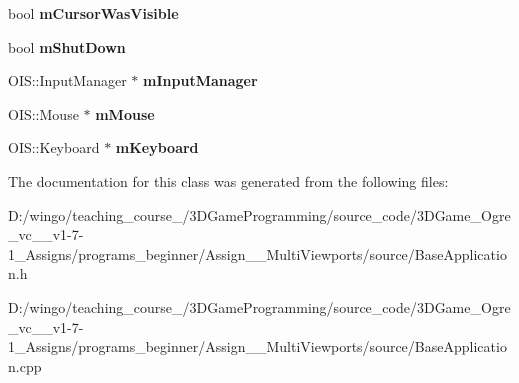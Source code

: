 \begin{DoxyCompactItemize}
\item 
\hypertarget{class_base_application_ac7e861799862cb645f1d78b170aef80d}{
bool {\bfseries mCursorWasVisible}}
\label{class_base_application_ac7e861799862cb645f1d78b170aef80d}

\item 
\hypertarget{class_base_application_a755f26d3a9915aaf830750d877e39d86}{
bool {\bfseries mShutDown}}
\label{class_base_application_a755f26d3a9915aaf830750d877e39d86}

\item 
\hypertarget{class_base_application_abc9503c8462e225b5d0d55c952d9e4a9}{
OIS::InputManager $\ast$ {\bfseries mInputManager}}
\label{class_base_application_abc9503c8462e225b5d0d55c952d9e4a9}

\item 
\hypertarget{class_base_application_add9b97fbe64da2814d3af113bac58c43}{
OIS::Mouse $\ast$ {\bfseries mMouse}}
\label{class_base_application_add9b97fbe64da2814d3af113bac58c43}

\item 
\hypertarget{class_base_application_a9d6e19cf50c47379fbaae55bff28079c}{
OIS::Keyboard $\ast$ {\bfseries mKeyboard}}
\label{class_base_application_a9d6e19cf50c47379fbaae55bff28079c}

\end{DoxyCompactItemize}


The documentation for this class was generated from the following files:\begin{DoxyCompactItemize}
\item 
D:/wingo/teaching\_\-course\_/3DGameProgramming/source\_\-code/3DGame\_\-Ogre\_\-vc\_\_\-v1-\/7-\/1\_\-Assigns/programs\_\-beginner/Assign\_\_\-MultiViewports/source/BaseApplication.h\item 
D:/wingo/teaching\_\-course\_/3DGameProgramming/source\_\-code/3DGame\_\-Ogre\_\-vc\_\_\-v1-\/7-\/1\_\-Assigns/programs\_\-beginner/Assign\_\_\-MultiViewports/source/BaseApplication.cpp\end{DoxyCompactItemize}
